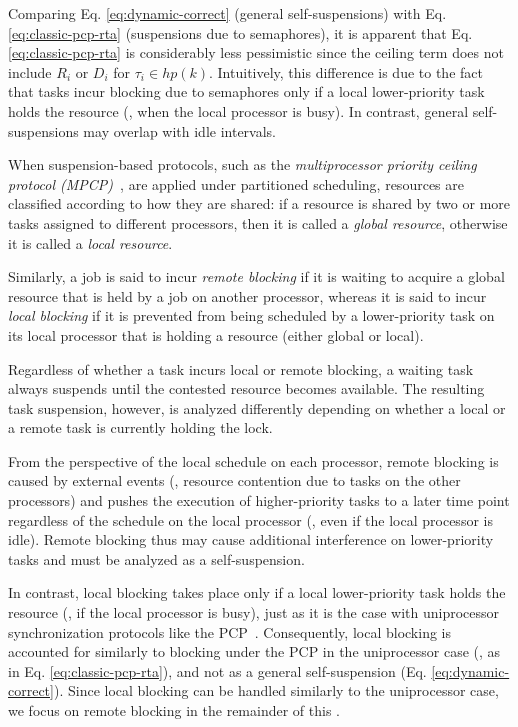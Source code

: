 Comparing Eq. \eqref{eq:dynamic-correct} (general self-suspensions) with Eq.  \eqref{eq:classic-pcp-rta} (suspensions due to semaphores), it is apparent that Eq. \eqref{eq:classic-pcp-rta} is considerably less pessimistic since the ceiling term does not include $R_i$ or $D_i$ for $\tau_i \in hp(k)$. Intuitively, this difference is due to the fact that tasks incur blocking due to semaphores only if a local lower-priority task holds the resource (\ie, when the local processor is busy). In contrast, general self-suspensions may overlap with idle intervals.


\label{sec:sem-multi}

When suspension-based protocols, such as the \emph{multiprocessor priority ceiling protocol (MPCP)}~\cite{rajkumar-1990}, are applied under partitioned scheduling, resources are classified according to how they are shared: if a resource is shared by two or more tasks assigned to different processors, then it is called a \emph{global resource}, otherwise it is called a \emph{local resource}.

Similarly, a job is said to incur \emph{remote blocking} if it is waiting to acquire a global resource that is held by a job on another processor, whereas it is said to incur \emph{local blocking} if it is prevented from being scheduled by a lower-priority task on its local processor that is holding a resource (either global or local).

Regardless of whether a task incurs local or remote blocking, a waiting task always suspends until the contested resource becomes available. The resulting task suspension, however, is analyzed differently depending on whether a local or a remote task is currently holding the lock.

From the perspective of the local schedule on each processor, remote blocking is caused by external events (\ie, resource contention due to tasks on the other processors) and pushes the execution of higher-priority tasks to a later time point regardless of the schedule on the local processor (\ie, even if the local processor is idle). Remote blocking thus may cause additional interference on lower-priority tasks and must be analyzed as a self-suspension.

In contrast, local blocking takes place only if a local lower-priority task holds the resource (\ie, if the local processor is busy), just as it is the case with uniprocessor synchronization protocols like the PCP~\cite{SRL:90}. Consequently, local blocking is accounted for similarly to blocking under the PCP in the uniprocessor case (\ie, as in Eq. \eqref{eq:classic-pcp-rta}), and not as a general self-suspension (Eq. \eqref{eq:dynamic-correct}). Since local blocking can be handled similarly to the uniprocessor case, we focus on remote blocking in the remainder of this \mysectionrefnormal{}.


